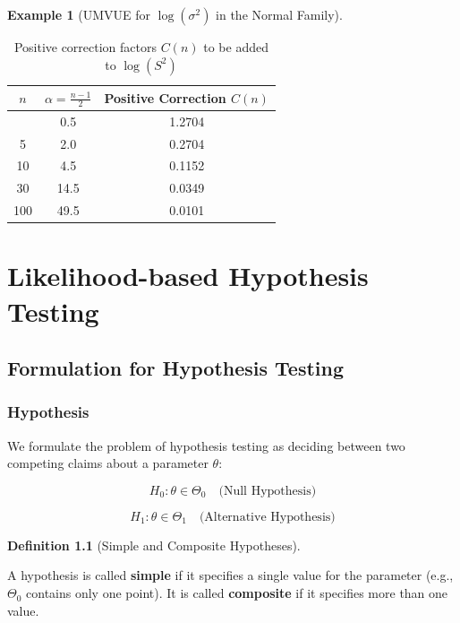 \documentclass[
  letterpaper,
  DIV=11,
  numbers=noendperiod]{scrreprt}
\renewcommand{\[}{\begin{equation}}
\renewcommand{\]}{\end{equation}}
\theoremstyle{definition}
\newtheorem{definition}{Definition}[chapter]
\theoremstyle{plain}
\theoremstyle{plain}
\theoremstyle{plain}
\theoremstyle{definition}
\newtheorem{example}{Example}[chapter]
\theoremstyle{plain}
\theoremstyle{remark}
\begin{document}
\begin{example}[UMVUE for \(\log(\sigma^2)\) in the Normal
Family]
\begin{longtable}[]{@{}ccc@{}}

\caption{\label{tbl-log-bias-correction}Positive correction factors
\(C(n)\) to be added to \(\log(S^2)\)}

\tabularnewline

\toprule\noalign{}
\(n\) & \(\alpha = \frac{n-1}{2}\) & Positive Correction \(C(n)\) \\
\midrule\noalign{}
\endhead
\bottomrule\noalign{}
\endlastfoot
2 & 0.5 & 1.2704 \\
5 & 2.0 & 0.2704 \\
10 & 4.5 & 0.1152 \\
30 & 14.5 & 0.0349 \\
100 & 49.5 & 0.0101 \\

\end{longtable}

\end{example}


\chapter{Likelihood-based Hypothesis
Testing}\label{likelihood-based-hypothesis-testing}

\section{Formulation for Hypothesis
Testing}\label{formulation-for-hypothesis-testing}

\subsection{Hypothesis}\label{hypothesis}

We formulate the problem of hypothesis testing as deciding between two
competing claims about a parameter \(\theta\):

\[
H_0: \theta \in \Theta_0 \quad \text{(Null Hypothesis)}
\]

\[
H_1: \theta \in \Theta_1 \quad \text{(Alternative Hypothesis)}
\]

\begin{definition}[Simple and Composite
Hypotheses]\protect\hypertarget{def-simple-composite}{}\label{def-simple-composite}

A hypothesis is called \textbf{simple} if it specifies a single value
for the parameter (e.g., \(\Theta_0\) contains only one point). It is
called \textbf{composite} if it specifies more than one value.

\end{definition}
\end{document}
